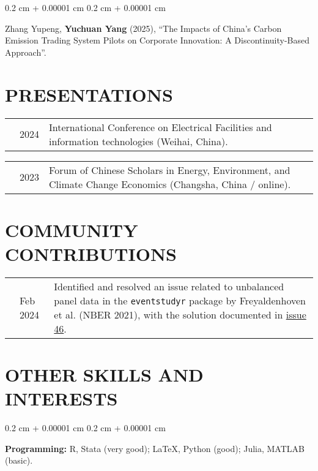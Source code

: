 \documentclass[10pt, letterpaper]{article}
\newenvironment{onecolentry}{
    \begin{adjustwidth}{
        0.2 cm + 0.00001 cm
    }{
        0.2 cm + 0.00001 cm
    }
}{
    \end{adjustwidth}
} %
\newenvironment{paper}{\vspace{.2cm}\begin{samepage}\begin{onecolentry}}{\end{onecolentry}\end{samepage}\vspace{0.2cm}}
\begin{document}
\begin{paper}
	Zhang Yupeng, \textbf{Yuchuan Yang} (2025), ``The Impacts of China’s Carbon Emission Trading System Pilots on Corporate Innovation: A Discontinuity-Based Approach''.
\end{paper}



\section{PRESENTATIONS}

\vspace{.2cm}
\begin{tabularx}{\textwidth}{@{}p{.2cm} @{}p{1cm} X@{}}
& 2024 & International Conference on Electrical Facilities and information technologies (Weihai, China).
\end{tabularx}

\vspace{.2cm}

\begin{tabularx}{\textwidth}{@{}p{.2cm} @{}p{1cm} X@{}}
& 2023 & Forum of Chinese Scholars in Energy, Environment, and Climate Change Economics (Changsha, China / online).
\end{tabularx}

\vspace{.2cm}



\section{COMMUNITY CONTRIBUTIONS}

\vspace{.2cm}
\begin{tabularx}{\textwidth}{@{}p{.2cm} @{}p{1.5cm} X@{}}
	& Feb 2024 & Identified and resolved an issue related to unbalanced panel data in the \texttt{eventstudyr} package by Freyaldenhoven et al. (NBER 2021), with the solution documented in \href{https://github.com/JMSLab/eventstudyr/issues/46}{issue 46}.
\end{tabularx}

\vspace{.2cm}


\section{OTHER SKILLS AND INTERESTS}

\begin{paper}
	\textbf{Programming:} R, Stata (very good); \LaTeX, Python (good); Julia, MATLAB (basic).
\end{paper}
\end{document}
